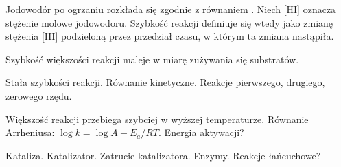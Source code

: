 Jodowodór po ogrzaniu rozkłada się zgodnie z równaniem .
Niech [HI] oznacza stężenie molowe jodowodoru.
Szybkość reakcji definiuje się wtedy jako zmianę stężenia [HI] podzieloną przez przedział czasu, w którym ta zmiana nastąpiła.

Szybkość większości reakcji maleje w miarę zużywania się substratów.

Stała szybkości reakcji.
Równanie kinetyczne.
Reakcje pierwszego, drugiego, zerowego rzędu.

Większość reakcji przebiega szybciej w wyższej temperaturze.
Równanie Arrheniusa: $\log k = \log A - E_a/RT$.
Energia aktywacji?

Kataliza.
Katalizator.
Zatrucie katalizatora.
Enzymy.
Reakcje łańcuchowe?
